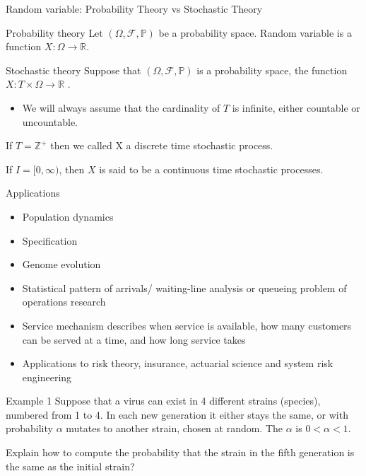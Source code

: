 \documentclass[12pt,ignorenonframetext,]{beamer}
\providecommand{\tightlist}{%
  \setlength{\itemsep}{0pt}\setlength{\parskip}{0pt}}
\begin{document}
\begin{frame}{Random variable: Probability Theory vs Stochastic Theory}
\protect\hypertarget{random-variable-probability-theory-vs-stochastic-theory}{}
\begin{block}{Probability theory}
\protect\hypertarget{probability-theory}{}
Let \((\Omega, \mathscr{F}, \mathbb{P})\) be a probability space. Random
variable is a function \(X: \Omega \rightarrow \mathbb{R}\).
\end{block}

\begin{block}{Stochastic theory}
\protect\hypertarget{stochastic-theory}{}
Suppose that \((\Omega, \mathscr{F}, \mathbb{P})\) is a probability
space, the function \(X: T \times \Omega \rightarrow \mathbb{R}\) .

\begin{itemize}
\tightlist
\item
  We will always assume that the cardinality of \(T\) is infinite,
  either countable or uncountable.
\end{itemize}

If \(T=\mathbb{Z}^+\) then we called X a discrete time stochastic
process.

If \(I = [0,\infty)\), then \(X\) is said to be a continuous time
stochastic processes.
\end{block}
\end{frame}

\begin{frame}{Applications}
\protect\hypertarget{applications}{}
\begin{itemize}
\item
  Population dynamics
\item
  Specification
\item
  Genome evolution
\item
  Statistical pattern of arrivals/ waiting-line analysis or queueing
  problem of operations research
\item
  Service mechanism describes when service is available, how many
  customers can be served at a time, and how long service takes
\item
  Applications to risk theory, insurance, actuarial science and system
  risk engineering
\end{itemize}
\end{frame}

\begin{frame}{Example 1}
\protect\hypertarget{example-1}{}
Suppose that a virus can exist in 4 different strains (species),
numbered from 1 to 4. In each new generation it either stays the same,
or with probability \(\alpha\) mutates to another strain, chosen at
random. The \(\alpha\) is \(0 < \alpha < 1\).

Explain how to compute the probability that the strain in the fifth
generation is the same as the initial strain?
\end{frame}
\end{document}
